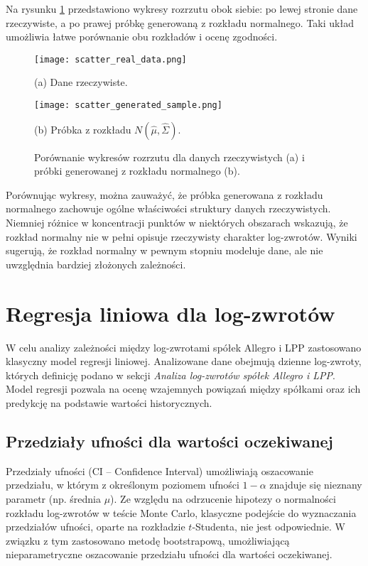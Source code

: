 \documentclass[12pt]{article}
\begin{document}
Na rysunku \ref{fig:scatter_comparison} przedstawiono wykresy rozrzutu obok siebie: po lewej stronie dane rzeczywiste, a po prawej próbkę generowaną z rozkładu normalnego. Taki układ umożliwia łatwe porównanie obu rozkładów i ocenę zgodności.

\begin{figure}[H]
    \centering
    \begin{minipage}{0.45\textwidth}
        \centering
        \texttt{[image: scatter\_real\_data.png]}
        \caption*{(a) Dane rzeczywiste.}
    \end{minipage}
    \hfill
    \begin{minipage}{0.45\textwidth}
        \centering
        \texttt{[image: scatter\_generated\_sample.png]}
        \caption*{(b) Próbka z rozkładu \( N(\hat{\mu}, \hat{\Sigma}) \).}
    \end{minipage}
    \caption{Porównanie wykresów rozrzutu dla danych rzeczywistych (a) i próbki generowanej z rozkładu normalnego (b).}
    \label{fig:scatter_comparison}
\end{figure}

Porównując wykresy, można zauważyć, że próbka generowana z rozkładu normalnego zachowuje ogólne właściwości struktury danych rzeczywistych. Niemniej różnice w koncentracji punktów w niektórych obszarach wskazują, że rozkład normalny nie w pełni opisuje rzeczywisty charakter log-zwrotów. Wyniki sugerują, że rozkład normalny w pewnym stopniu modeluje dane, ale nie uwzględnia bardziej złożonych zależności.


\section{Regresja liniowa dla log-zwrotów}
W celu analizy zależności między log-zwrotami spółek Allegro i LPP zastosowano klasyczny model regresji liniowej. Analizowane dane obejmują dzienne log-zwroty, których definicję podano w sekcji \textit{Analiza log-zwrotów spółek Allegro i LPP}. Model regresji pozwala na ocenę wzajemnych powiązań między spółkami oraz ich predykcję na podstawie wartości historycznych.


\subsection{Przedziały ufności dla wartości oczekiwanej}
Przedziały ufności (CI – Confidence Interval) umożliwiają oszacowanie przedziału, w którym z określonym poziomem ufności \(1 - \alpha\) znajduje się nieznany parametr (np. średnia \(\mu\)). Ze względu na odrzucenie hipotezy o normalności rozkładu log-zwrotów w teście Monte Carlo, klasyczne podejście do wyznaczania przedziałów ufności, oparte na rozkładzie $t$-Studenta, nie jest odpowiednie. W związku z tym zastosowano metodę bootstrapową, umożliwiającą nieparametryczne oszacowanie przedziału ufności dla wartości oczekiwanej. 
\end{document}
